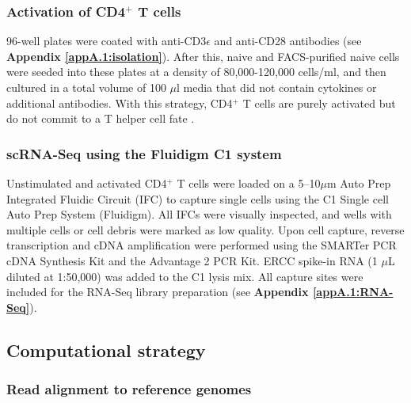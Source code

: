 \newpage

\subsubsection{Activation of CD4$^+$ T cells}

96-well plates were coated with anti-CD3$\epsilon$ and anti-CD28 antibodies (see \textbf{Appendix \ref{appA.1:isolation}}). After this, naive and FACS-purified naive cells were seeded into these plates at a density of 80,000-120,000 cells/ml, and then cultured in a total volume of 100 $\mu$l media that did not contain cytokines or additional antibodies. With this strategy, CD4$^+$ T cells are purely activated but do not commit to a T helper cell fate \citep{Stubbington2015, Zhu2010}.

\subsubsection{scRNA-Seq using the Fluidigm C1 system}

Unstimulated and activated CD4$^+$ T cells were loaded on a 5–10$\mu$m Auto Prep Integrated Fluidic Circuit (IFC) to capture single cells using the C1 Single cell Auto Prep System (Fluidigm). All IFCs were visually inspected, and wells with multiple cells or cell debris were marked as low quality. Upon cell capture, reverse transcription and cDNA amplification were performed using the SMARTer PCR cDNA Synthesis Kit and the Advantage 2 PCR Kit. ERCC spike-in RNA (1 $\mu$L diluted at 1:50,000) was added to the C1 lysis mix. All capture sites were included for the RNA-Seq library preparation (see \textbf{Appendix \ref{appA.1:RNA-Seq}}).

\subsection{Computational strategy}

\subsubsection{Read alignment to reference genomes}

